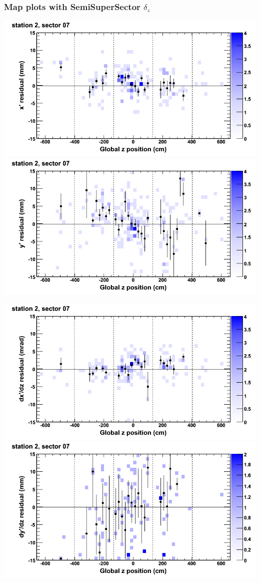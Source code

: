 \documentclass[compress]{beamer}
\begin{document}
\begin{frame}
\frametitle{Map plots with SemiSuperSector $\delta_z$}
\includegraphics[width=0.5\linewidth]{zfit_mapplots/DTvsz_st2sec07_x.png}
\includegraphics[width=0.5\linewidth]{zfit_mapplots/DTvsz_st2sec07_y.png}

\includegraphics[width=0.5\linewidth]{zfit_mapplots/DTvsz_st2sec07_dxdz.png}
\includegraphics[width=0.5\linewidth]{zfit_mapplots/DTvsz_st2sec07_dydz.png}
\end{frame}
\end{document}
